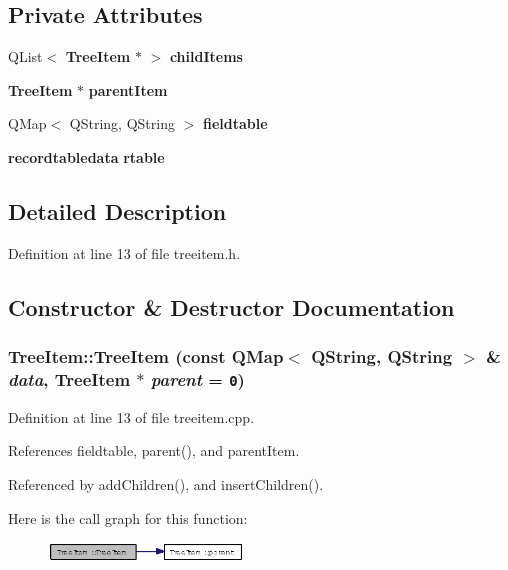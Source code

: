 \subsection*{Private Attributes}
\begin{CompactItemize}
\item 
QList$<$ {\bf Tree\-Item} $\ast$ $>$ {\bf child\-Items}
\item 
{\bf Tree\-Item} $\ast$ {\bf parent\-Item}
\item 
QMap$<$ QString, QString $>$ {\bf fieldtable}
\item 
{\bf recordtabledata} {\bf rtable}
\end{CompactItemize}


\subsection{Detailed Description}




Definition at line 13 of file treeitem.h.

\subsection{Constructor \& Destructor Documentation}
\subsubsection{\setlength{\rightskip}{0pt plus 5cm}Tree\-Item::Tree\-Item (const QMap$<$ QString, QString $>$ \& {\em data}, {\bf Tree\-Item} $\ast$ {\em parent} = {\tt 0})}\label{classTreeItem_508184fa6523340f5456e530e492e2a4}




Definition at line 13 of file treeitem.cpp.

References fieldtable, parent(), and parent\-Item.

Referenced by add\-Children(), and insert\-Children().

Here is the call graph for this function:\begin{figure}[H]
\begin{center}
\leavevmode
\includegraphics[width=147pt]{classTreeItem_508184fa6523340f5456e530e492e2a4_cgraph}
\end{center}
\end{figure}



